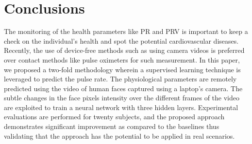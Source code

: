 \section{Conclusions}\label{sec:concl}

The monitoring of the health parameters like PR and PRV is important to keep a check on the individual's health and spot the potential cardiovascular diseases. Recently, the use of device-free methods such as using camera videos is preferred over contact methods like pulse oximeters for such measurement. In this paper, we proposed a two-fold methodology wherein a supervised learning technique is leveraged to predict the pulse rate. The physiological parameters are remotely predicted using the video of human faces captured using a laptop's camera. The subtle changes in the face pixels intensity over the different frames of the video are exploited to train a neural network with three hidden layers. Experimental evaluations are performed for twenty subjects, and the proposed approach demonstrates significant improvement as compared to the baselines thus validating that the approach has the potential to be applied in real scenarios. 





%


%